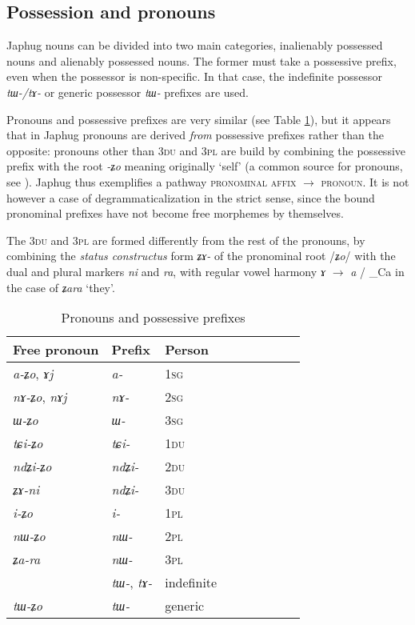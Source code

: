 \documentclass[oneside,a4paper,11pt]{article}
\newcommand{\ipa}[1]{\mbox{\phon\textit{#1}}} %
\begin{document}
 \subsection{Possession and pronouns} \label{sec:pronouns}
 
Japhug  nouns can be divided into two main categories, inalienably possessed nouns and alienably possessed nouns. The former must take a possessive prefix, even when the possessor is non-specific. In that case, the indefinite possessor \ipa{tɯ-/tɤ-} or generic possessor \ipa{tɯ-} prefixes are used.

Pronouns  and possessive prefixes are very similar (see Table \ref{tab:pronoun}), but it appears that in Japhug pronouns are derived \textit{from} possessive prefixes rather than the opposite: pronouns other than \textsc{3du} and \textsc{3pl} are build by combining the possessive prefix with the root \ipa{-ʑo} meaning originally `self' (a common source for pronouns, see \citealt{heine11pronoms}). Japhug thus exemplifies a pathway \textsc{pronominal affix} $\rightarrow$ \textsc{pronoun}. It is not however a case of degrammaticalization in the strict sense, since the bound pronominal prefixes have not become free morphemes by themselves.

The \textsc{3du} and \textsc{3pl} are formed differently from the rest of the pronouns, by combining the \textit{status constructus} form \ipa{ʑɤ-} of the pronominal root /\ipa{ʑo}/ with the dual and plural markers \ipa{ni} and \ipa{ra}, with regular vowel harmony \ipa{ɤ} $\rightarrow$ \ipa{a} / \_Ca in the case of \ipa{ʑara} `they'.
 
 \begin{table}[H] \centering
\caption{Pronouns and possessive prefixes }\label{tab:pronoun}
\begin{tabular}{lllllllll} 
\toprule
 Free pronoun & Prefix & Person\\
\midrule
 \ipa{a-ʑo},    \ipa{ɤj} &	\ipa{a-}  &		1\textsc{sg} \\
\ipa{nɤ-ʑo},  \ipa{nɤj} &	\ipa{nɤ-}  &			2\textsc{sg}\\
\ipa{ɯ-ʑo}  &	\ipa{ɯ-}  &			3\textsc{sg}\\
\midrule
\ipa{tɕi-ʑo}  &	\ipa{tɕi-}  &			1\textsc{du} \\
\ipa{ndʑi-ʑo}  &	\ipa{ndʑi-}  &		2\textsc{du} \\	
\ipa{ʑɤ-ni}  &	\ipa{ndʑi-}  &		3\textsc{du} \\	
\midrule
\ipa{i-ʑo}    &	\ipa{i-}  &			1\textsc{pl} \\
\ipa{nɯ-ʑo}   &	\ipa{nɯ-}  &			2\textsc{pl} \\
\ipa{ʑa-ra}  &	\ipa{nɯ-}  &			3\textsc{pl} \\
\midrule
&  \ipa{tɯ-},  \ipa{tɤ-} & indefinite \\
\ipa{tɯ-ʑo} & \ipa{tɯ-}   &  generic\\
\bottomrule
\end{tabular}
\end{table}
 
\end{document}

